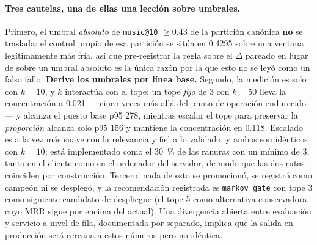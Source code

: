 \documentclass[11pt]{article}
\begin{document}
\paragraph{Tres cautelas, una de ellas una lección sobre umbrales.} Primero, el
umbral \emph{absoluto} de \texttt{music@10} $\ge\num{0.43}$ de la partición canónica
\textbf{no} se traslada: el control propio de esa partición se sitúa en \num{0.4295}
sobre una ventana legítimamente más fría, así que pre-registrar la regla sobre el
$\Delta$ pareado en lugar de sobre un umbral absoluto es la única razón por la que
esto no se leyó como un falso fallo. \textbf{Derive los umbrales por línea base.}
Segundo, la medición es solo con $k=\num{10}$, y $k$ interactúa con el tope: un tope
\emph{fijo} de 3 con $k=\num{50}$ lleva la concentración a \num{0.021} --- cinco
veces más allá del punto de operación endurecido --- y alcanza el puesto base p95
\num{278}, mientras escalar el tope para preservar la \emph{proporción} alcanza solo
p95 \num{156} y mantiene la concentración en \num{0.118}. Escalado es a la vez más
suave con la relevancia y fiel a lo validado, y ambos son idénticos con
$k=\num{10}$; está implementado como el \SI{30}{\percent} de las ranuras con un
mínimo de 3, tanto en el cliente como en el ordenador del servidor, de modo que las
dos rutas coinciden por construcción. Tercero, nada de esto se promocionó, se
registró como campeón ni se desplegó, y la recomendación registrada es
\texttt{markov\_gate} con tope 3 como siguiente candidato de despliegue (el tope 5
como alternativa conservadora, cuyo MRR sigue por encima del actual). Una divergencia
abierta entre evaluación y servicio a nivel de fila, documentada por separado,
implica que la salida en producción será cercana a estos números pero no idéntica.
\end{document}
